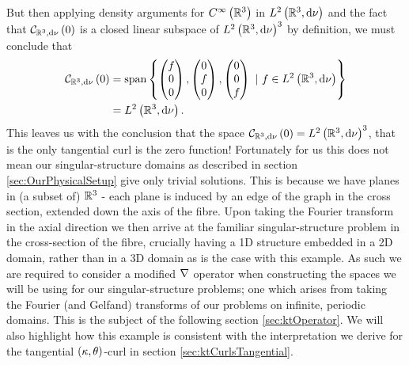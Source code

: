 But then applying density arguments for $C^{\infty}\left( \mathbb{R}^3 \right)$ in $L^{2}\left( \mathbb{R}^3,\mathrm{d}\nu \right)$ and the fact that $\mathcal{C}_{ \mathbb{R}^3, \mathrm{d}\nu}\left( 0 \right)$ is a closed linear subspace of $L^{2}\left( \mathbb{R}^3,\mathrm{d}\nu \right)^3$ by definition, we must conclude that
\begin{align*}
	\mathcal{C}_{ \mathbb{R}^3, \mathrm{d}\nu}\left( 0 \right) &= \mathrm{span}\left\{ 	
	\begin{pmatrix}	f \\ 0 \\ 0	\end{pmatrix},
	\begin{pmatrix}	0 \\ f \\ 0	\end{pmatrix},
	\begin{pmatrix}	0 \\ 0 \\ f	\end{pmatrix}
	\ \vert \ f\in L^{2}\left( \mathbb{R}^3,\mathrm{d}\nu \right)
	 \right\} \\
	&= L^{2}\left( \mathbb{R}^3,\mathrm{d}\nu \right).
\end{align*}
This leaves us with the conclusion that the space $\mathcal{C}_{ \mathbb{R}^3, \mathrm{d}\nu}\left( 0 \right) = L^{2}\left( \mathbb{R}^3,\mathrm{d}\nu \right)^3$, that is the only tangential curl is the zero function!
Fortunately for us this does not mean our singular-structure domains as described in section \ref{sec:OurPhysicalSetup} give only trivial solutions.
This is because we have planes in (a subset of) $\mathbb{R}^3$ - each plane is induced by an edge of the graph in the cross section, extended down the axis of the fibre. 
Upon taking the Fourier transform in the axial direction we then arrive at the familiar singular-structure problem in the cross-section of the fibre, crucially having a 1D structure embedded in a 2D domain, rather than in a 3D domain as is the case with this example.
As such we are required to consider a modified $\nabla$ operator when constructing the spaces we will be using for our singular-structure problems; one which arises from taking the Fourier (and Gelfand) transforms of our problems on infinite, periodic domains.
This is the subject of the following section \ref{sec:ktOperator}.
We will also highlight how this example is consistent with the interpretation we derive for the tangential $\left( \kappa, \theta \right)$-curl in section \ref{sec:ktCurlsTangential}.

